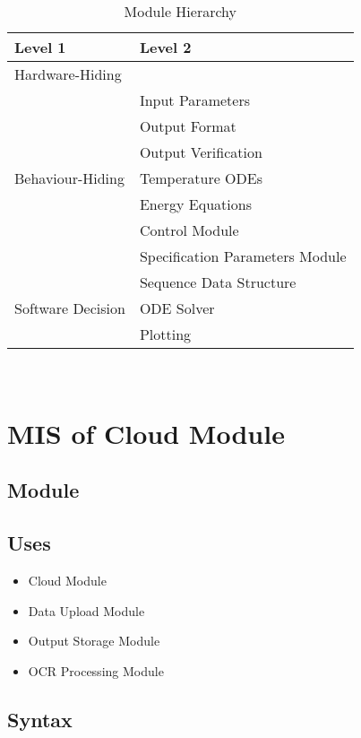 \documentclass[12pt, titlepage]{article}
\begin{document}
\begin{table}[h!]
\centering
\begin{tabular}{p{} p{}}
\toprule
\textbf{Level 1} & \textbf{Level 2}\\
\midrule

{Hardware-Hiding} & ~ \\
\midrule

\multirow{7}{0.3\textwidth}{Behaviour-Hiding} & Input Parameters\\
& Output Format\\
& Output Verification\\
& Temperature ODEs\\
& Energy Equations\\ 
& Control Module\\
& Specification Parameters Module\\
\midrule

\multirow{3}{0.3\textwidth}{Software Decision} & {Sequence Data Structure}\\
& ODE Solver\\
& Plotting\\
\bottomrule

\end{tabular}
\caption{Module Hierarchy}
\label{TblMH}
\end{table}

\newpage
~\newpage

\section{MIS of Cloud Module} \label{Module}

\subsection{Module}

\subsection{Uses}

\begin{itemize}
  \item Cloud Module
  \item Data Upload Module
  \item Output Storage Module
  \item OCR Processing Module
\end{itemize}

\subsection{Syntax}
\end{document}
